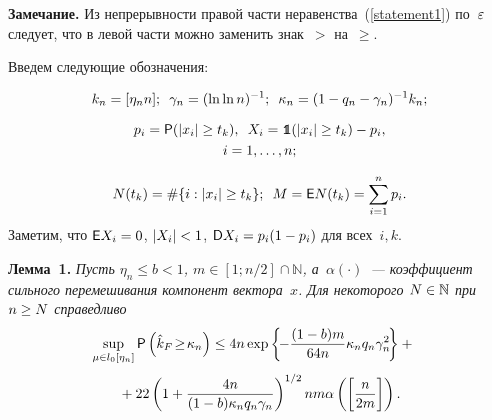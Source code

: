 \begin{multicols}{2}
\smallskip

\noindent
\textbf{Замечание.}
Из непрерывности правой части неравенства~(\ref{statement1}) по~$\varepsilon$ следует, 
что в левой части можно заменить знак~$>$ на~$\geq$.


\smallskip

Введем следующие обозначения:

\vspace*{-6pt}

$$
k_n = [\eta_n n]; \enskip \gamma_n = (\ln\ln n)^{-1}; \enskip \kappa_n = (1 - q_n - \gamma_n)^{-1} k_n;
$$

\vspace*{-12pt}

\noindent
\begin{multline*}
p_i = {\sf P}(|x_i|\geq t_k), \enskip X_i = \mbox{{{\tt 1}}\hspace{-1.3mm}{\sf 1}}(|x_i|\geq t_k) - p_i, \\ i=1,\ldots,n;
\end{multline*}

\vspace*{-3pt}

\noindent
$$
N(t_k) = \#\{i : |x_i| \geq t_k\};\enskip M = {\sf E} N(t_k) = \sum\limits_{i=1}^n  p_i.
$$
Заметим, что $\e X_i \hm= 0$, $|X_i| \hm< 1$, $\D X_i \hm= p_i(1\hm-p_i)$ для всех~$i, k$.

\smallskip

\noindent
\textbf{Лемма~1.}
\textit{Пусть $\eta_n \leq b<1$, $m\in[1;n/2]\cap\mathbb{N}$, а~$\alpha(\cdot)$~--- 
коэффициент сильного перемешивания компонент вектора~$x$. Для некоторого 
$N\hm\in\mathbb{N}$ при $n \hm\geq N$ справедливо}
\begin{multline*}
\hspace*{-7.9pt}\sup\limits_{\mu\in l_0[\eta_n]} {\sf P} \left(\hat{k}_F \!\geq\! \kappa_n \right) \leq 
4 n \exp\left\{ \!-\displaystyle\frac{\displaystyle (1-b)m\mathstrut}{\displaystyle 64n\mathstrut}  \kappa_n q_n \gamma_n^2   \! \right\}+{}\\[3pt]
{}+ 
22\left(1+\displaystyle\frac{\displaystyle 4n\mathstrut}{\displaystyle (1-b)\kappa_n q_n \gamma_n\mathstrut}\right)^{1/2} n m  \alpha\left(\left[\displaystyle\frac{\displaystyle n\mathstrut}{\displaystyle 2m\mathstrut}\right]\right).
\end{multline*}


\end{multicols}
